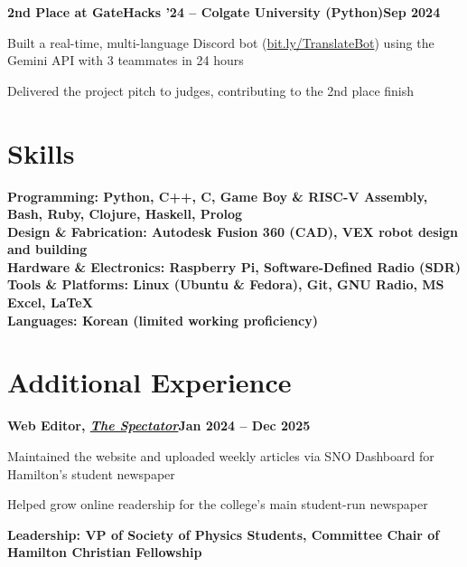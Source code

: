 \documentclass[letterpaper,10pt]{article}
\newcommand{\heading}[2]{
  \hspace{10pt}#1\hfill#2\\
}
\newcommand{\headingBf}[2]{
  \heading{\textbf{#1}}{\textbf{#2}}
}
\newenvironment{resume_list}{
  \vspace{-7pt}
  \begin{itemize}[itemsep=-2px, parsep=1pt, leftmargin=30pt]
}{
  \end{itemize}
}
\begin{document}
  \headingBf{2nd Place at GateHacks '24 -- Colgate University \textnormal{(Python)}}{Sep 2024}
  \begin{resume_list}
    \item Built a real-time, multi-language Discord bot (\textcolor{blue}{\href{https://github.com/Straekz/ColgateGateHacks-TranslateBot}{bit.ly/TranslateBot}}) using the Gemini API with 3 teammates in 24 hours
    \item Delivered the project pitch to judges, contributing to the 2nd place finish
  \end{resume_list}


  \section{Skills}

  \headingBf{Programming: \textnormal{Python, C++, C, Game Boy \& RISC-V Assembly, Bash, Ruby, Clojure, Haskell, Prolog}}{}
  \headingBf{Design \& Fabrication: \textnormal{Autodesk Fusion 360 (CAD), VEX robot design and building}}{}
  \headingBf{Hardware \& Electronics: \textnormal{Raspberry Pi, Software-Defined Radio (SDR)}}{}
  \headingBf{Tools \& Platforms: \textnormal{Linux (Ubuntu \& Fedora), Git, GNU Radio, MS Excel, LaTeX}}{}
  \headingBf{Languages: \textnormal{Korean (limited working proficiency)}}{}


  \section{Additional Experience}

  \headingBf{Web Editor, \emph{\href{https://hcspectator.com/}{The Spectator}}}{Jan 2024 -- Dec 2025}
  \begin{resume_list}
    \item Maintained the website and uploaded weekly articles via SNO Dashboard for Hamilton's student newspaper
    \item Helped grow online readership for the college's main student-run newspaper
  \end{resume_list}

  \headingBf{Leadership: \textnormal{VP of Society of Physics Students, Committee Chair of Hamilton Christian Fellowship}}{}
\end{document}
